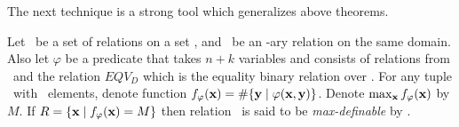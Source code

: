 The next technique is a strong tool which generalizes above theorems. 

\begin{defi}\label{def:max}
Let \mrelset\ be a set of relations on a set \mD, and \mR\ be an \mn-ary relation on the same 
domain. Also let \(\varphi\) be a predicate that takes \(n+k\) variables and
consists of relations from \mrelset\ and the relation
\(EQV_D\) which is the equality binary relation over \mD\@.
For any tuple \mn\ with \mn\ elements, denote function
\(f_\varphi(\textbf{x})=\#\{{\textbf{y}\mid \varphi(\textbf{x},\textbf{y})}\}\)\@.
Denote \(\max_{\textbf{x}} f_\varphi(\textbf{x})\) by \(M\)\@.
If  \(R=\{{\textbf{x} \mid f_\varphi(\textbf{x}) = M}\}\) then
relation \mR\ is said to be \emph{max-definable} by \mrelset\@.
\end{defi} 

